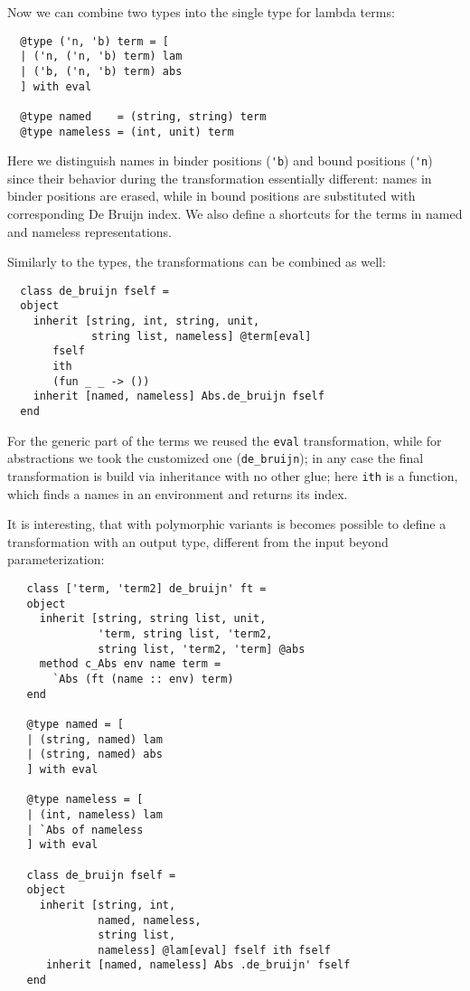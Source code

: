 \documentclass[twocolumn,8pt]{extarticle}
\newcommand{\cd}[1]{\texttt{#1}}
\begin{document}
Now we can combine two types into the single type for lambda terms:

\begin{lstlisting}
  @type ('n, 'b) term = [
  | ('n, ('n, 'b) term) lam
  | ('b, ('n, 'b) term) abs
  ] with eval

  @type named    = (string, string) term
  @type nameless = (int, unit) term
\end{lstlisting}

Here we distinguish names in binder positions (\lstinline{'b}) and bound positions (\lstinline{'n}) since their behavior during the
transformation essentially different: names in binder positions are erased, while in bound positions are substituted with corresponding
De Bruijn index. We also define a shortcuts for the terms in named and nameless representations.

Similarly to the types, the transformations can be combined as well:

\begin{lstlisting}
  class de_bruijn fself =
  object
    inherit [string, int, string, unit,
             string list, nameless] @term[eval]
       fself
       ith
       (fun _ _ -> ())
    inherit [named, nameless] Abs.de_bruijn fself
  end
\end{lstlisting}

For the generic part of the terms we reused the \cd{eval} transformation, while for abstractions we took the customized one (\lstinline{de_bruijn}); in
any case the final transformation is build via inheritance with no other glue; here \lstinline{ith} is a function, which finds a names in an
environment and returns its index.

It is interesting, that with polymorphic variants is becomes possible to define a transformation with an output type, different from the input
beyond parameterization:

\begin{lstlisting}
   class ['term, 'term2] de_bruijn' ft =
   object
     inherit [string, string list, unit,
              'term, string list, 'term2,
              string list, 'term2, 'term] @abs
     method c_Abs env name term =
       `Abs (ft (name :: env) term) 
   end
     
   @type named = [
   | (string, named) lam
   | (string, named) abs
   ] with eval
                     
   @type nameless = [
   | (int, nameless) lam
   | `Abs of nameless
   ] with eval

   class de_bruijn fself =
   object
     inherit [string, int,
              named, nameless,
              string list,
              nameless] @lam[eval] fself ith fself
      inherit [named, nameless] Abs .de_bruijn' fself 
   end
\end{lstlisting}
\end{document}
